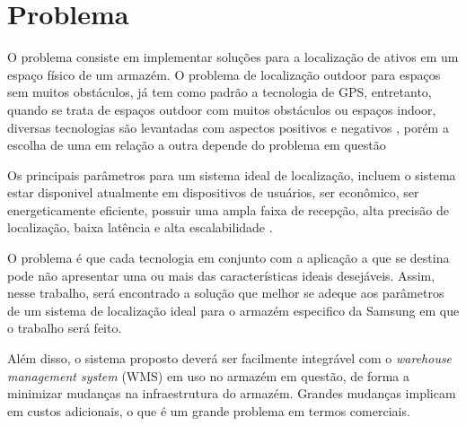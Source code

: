 \section{Problema}
\textual
O problema consiste em implementar soluções para a localização de ativos em um espaço físico de um armazém.
O problema de localização outdoor para espaços sem muitos obstáculos, já tem como padrão a tecnologia de GPS, entretanto, quando se trata de espaços outdoor com muitos obstáculos ou espaços indoor, diversas tecnologias são levantadas com aspectos positivos e negativos \cite{art4}, porém a escolha de uma em relação a outra depende do problema em questão

Os principais parâmetros para um sistema ideal de localização, incluem o sistema estar disponivel atualmente em dispositivos de usuários, ser econômico, ser energeticamente eficiente, possuir uma ampla faixa de recepção, alta precisão de localização, baixa latência e alta escalabilidade \cite{art2}.

O problema é que cada tecnologia em conjunto com a aplicação a que se destina pode não apresentar uma ou mais das características ideais desejáveis. Assim, nesse trabalho, será encontrado a solução que melhor se adeque aos parâmetros de um sistema de localização ideal para o armazém especifico da Samsung em que o trabalho será feito.

Além disso, o sistema proposto deverá ser facilmente integrável com o \textit{warehouse management system} (WMS) em uso no armazém em questão, de forma a minimizar mudanças na infraestrutura do armazém. Grandes mudanças implicam em custos adicionais, o que é um grande problema em termos comerciais.
